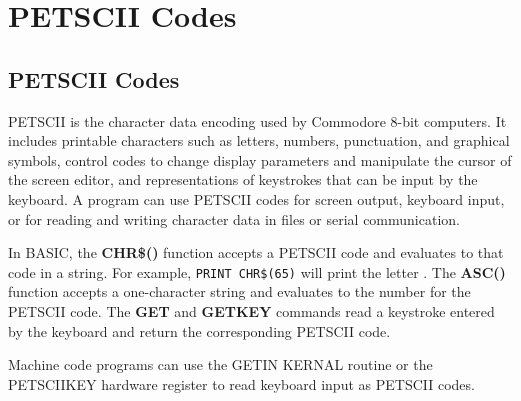 \chapter{PETSCII Codes}

\section{PETSCII Codes}

PETSCII is the character data encoding used by Commodore 8-bit computers. It includes printable characters such as letters, numbers, punctuation, and graphical symbols, control codes to change display parameters and manipulate the cursor of the screen editor, and representations of keystrokes that can be input by the keyboard. A program can use PETSCII codes for screen output, keyboard input, or for reading and writing character data in files or serial communication.

In BASIC, the \textbf{CHR\$()} function accepts a PETSCII code and evaluates to that code in a string. For example, \texttt{PRINT CHR\$(65)} will print the letter . The \textbf{ASC()} function accepts a one-character string and evaluates to the number for the PETSCII code. The \textbf{GET} and \textbf{GETKEY} commands read a keystroke entered by the keyboard and return the corresponding PETSCII code.

Machine code programs can use the GETIN KERNAL routine or the PETSCIIKEY hardware register to read keyboard input as PETSCII codes.


